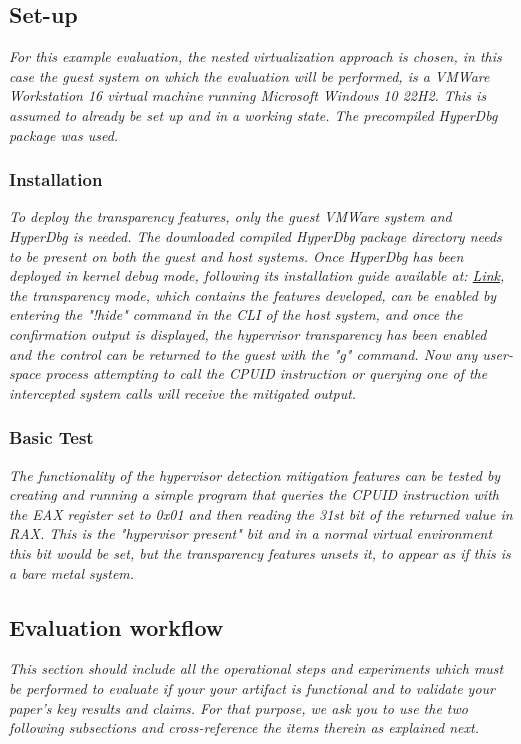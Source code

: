 \subsection{Set-up}

\textit{For this example evaluation, the nested virtualization approach is chosen, in this case the guest system on which the evaluation will be performed,
is a VMWare Workstation 16 virtual machine running Microsoft Windows 10 22H2. This is assumed to already be set up and in a working state. The precompiled HyperDbg package was used.}

\subsubsection{Installation}
\textit{To deploy the transparency features, only the guest VMWare system and HyperDbg is needed. The downloaded compiled HyperDbg package directory needs to be present on both the guest and host systems. 
Once HyperDbg has been deployed in kernel debug mode, following its installation guide available at: \href{https://docs.hyperdbg.org/getting-started/build-and-install}{Link}, the transparency mode, 
which contains the features developed, can be enabled by entering the "!hide" command in the CLI of the host system, and once the confirmation output is displayed, the hypervisor transparency has been enabled 
and the control can be returned to the guest with the "g" command. Now any user-space process attempting to call the CPUID instruction or querying one of the intercepted system calls 
will receive the mitigated output.}

\subsubsection{Basic Test}
\textit{The functionality of the hypervisor detection mitigation features can be tested by creating and running a simple program that queries the CPUID instruction with the EAX register set to 0x01
 and then reading the 31st bit of the returned value in RAX. This is the "hypervisor present" bit and in a normal virtual environment this bit would be set, but the transparency features unsets it, 
 to appear as if this is a bare metal system.}

\subsection{Evaluation workflow}
\textit{This section should include all the operational
steps and experiments which must be performed to evaluate if your your artifact is
functional and to validate your paper's key results and claims. For that
purpose, we ask you to use the two following subsections and cross-reference the
items therein as explained next.}

